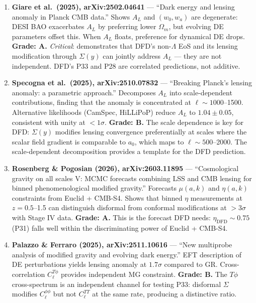\documentclass[11pt,a4paper]{article}
\begin{document}
\begin{enumerate}

\item \textbf{Giare et al.\ (2025), arXiv:2502.04641} --- ``Dark energy and lensing anomaly in Planck CMB data.'' Shows $A_L$ and $(w_0, w_a)$ are degenerate: DESI BAO exacerbates $A_L$ by preferring lower $\Omega_m$, but evolving DE parameters offset this. When $A_L$ floats, preference for dynamical DE drops. \textbf{Grade: A.} \emph{Critical}: demonstrates that DFD's non-$\Lambda$ EoS and its lensing modification through $\Sigma(y)$ can jointly address $A_L$ --- they are not independent. DFD's P33 and P28 are correlated predictions, not additive.

\item \textbf{Specogna et al.\ (2025), arXiv:2510.07832} --- ``Breaking Planck's lensing anomaly: a parametric approach.'' Decomposes $A_L$ into scale-dependent contributions, finding that the anomaly is concentrated at $\ell \sim 1000$--1500. Alternative likelihoods (CamSpec, HiLLiPoP) reduce $A_L$ to $1.04 \pm 0.05$, consistent with unity at $< 1\sigma$. \textbf{Grade: B.} The scale dependence is key for DFD: $\Sigma(y)$ modifies lensing convergence preferentially at scales where the scalar field gradient is comparable to $a_0$, which maps to $\ell \sim 500$--2000. The scale-dependent decomposition provides a template for the DFD prediction.

\item \textbf{Rosenberg \& Pogosian (2026), arXiv:2603.11895} --- ``Cosmological gravity on all scales V: MCMC forecasts combining LSS and CMB lensing for binned phenomenological modified gravity.'' Forecasts $\mu(a,k)$ and $\eta(a,k)$ constraints from Euclid + CMB-S4. Shows that binned $\eta$ measurements at $z = 0.5$--1.5 can distinguish disformal from conformal modifications at $>3\sigma$ with Stage IV data. \textbf{Grade: A.} This is the forecast DFD needs: $\eta_\mathrm{DFD} \sim 0.75$ (P31) falls well within the discriminating power of Euclid + CMB-S4.

\item \textbf{Palazzo \& Ferraro (2025), arXiv:2511.10616} --- ``New multiprobe analysis of modified gravity and evolving dark energy.'' EFT description of DE perturbations yields lensing anomaly at $1.7\sigma$ compared to GR. Cross-correlation $C_\ell^{T\phi}$ provides independent MG constraint. \textbf{Grade: B.} The $T\phi$ cross-spectrum is an independent channel for testing P33: disformal $\Sigma$ modifies $C_\ell^{\phi\phi}$ but not $C_\ell^{TT}$ at the same rate, producing a distinctive ratio.

\end{enumerate}
\end{document}
